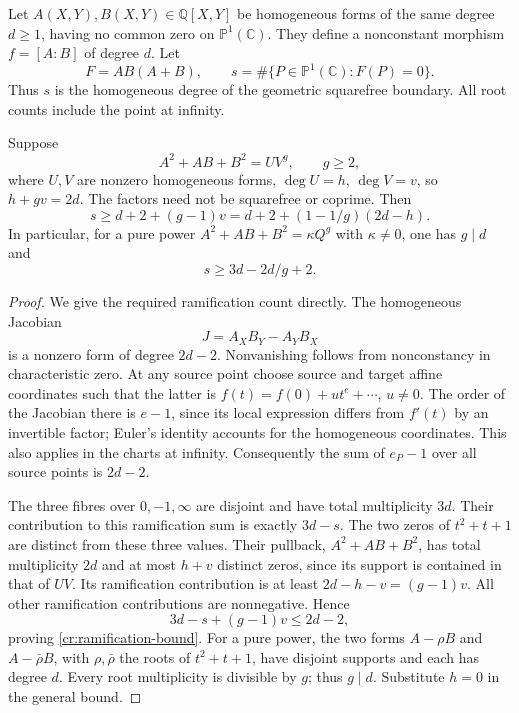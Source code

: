 Let $A(X,Y),B(X,Y)\in\mathbb Q[X,Y]$ be homogeneous forms of the same degree
$d\ge1$, having no common zero on $\mathbb P^1(\mathbb C)$. They define a
nonconstant morphism $f=[A:B]$ of degree $d$. Let
\[
 F=A B(A+B),\qquad s=\#\{P\in\mathbb P^1(\mathbb C):F(P)=0\}.
\]
Thus $s$ is the homogeneous degree of the geometric squarefree boundary.
All root counts include the point at infinity.

\begin{theorem}\label{cr:ramification-main}
Suppose
\[
 A^2+AB+B^2=U V^g,\qquad g\ge2,
\]
where $U,V$ are nonzero homogeneous forms, $\deg U=h$, $\deg V=v$, so
$h+gv=2d$. The factors need not be squarefree or coprime. Then
\begin{equation}\label{cr:ramification-bound}
 s\ge d+2+(g-1)v
   =d+2+(1-1/g)(2d-h).
\end{equation}
In particular, for a pure power $A^2+AB+B^2=\kappa Q^g$ with
$\kappa\ne0$, one has $g\mid d$ and
\begin{equation}\label{cr:pure}
 s\ge3d-2d/g+2.
\end{equation}
\end{theorem}
\begin{proof}
We give the required ramification count directly. The homogeneous Jacobian
\[
 J=A_XB_Y-A_YB_X
\]
is a nonzero form of degree $2d-2$. Nonvanishing follows from nonconstancy in
characteristic zero. At any source point choose source and target affine
coordinates such that the latter is $f(t)=f(0)+u t^e+\cdots$, $u\ne0$.
The order of the Jacobian there is $e-1$, since its local expression differs
from $f'(t)$ by an invertible factor; Euler's identity accounts for the
homogeneous coordinates. This also applies in the charts at infinity.
Consequently the sum of $e_P-1$ over all source points is $2d-2$.

The three fibres over $0,-1,\infty$ are disjoint and have total multiplicity
$3d$. Their contribution to this ramification sum is exactly $3d-s$.
The two zeros of $t^2+t+1$ are distinct from these three values. Their
pullback, $A^2+AB+B^2$, has total multiplicity $2d$ and at most $h+v$
distinct zeros, since its support is contained in that of $UV$. Its
ramification contribution is at least $2d-h-v=(g-1)v$. All other
ramification contributions are nonnegative. Hence
\[
 3d-s+(g-1)v\le2d-2,
\]
proving \eqref{cr:ramification-bound}.
For a pure power, the two forms $A-\rho B$ and $A-\bar\rho B$, with
$\rho,\bar\rho$ the roots of $t^2+t+1$, have disjoint supports and each
has degree $d$. Every root multiplicity is divisible by $g$; thus $g\mid d$.
Substitute $h=0$ in the general bound.
\end{proof}

